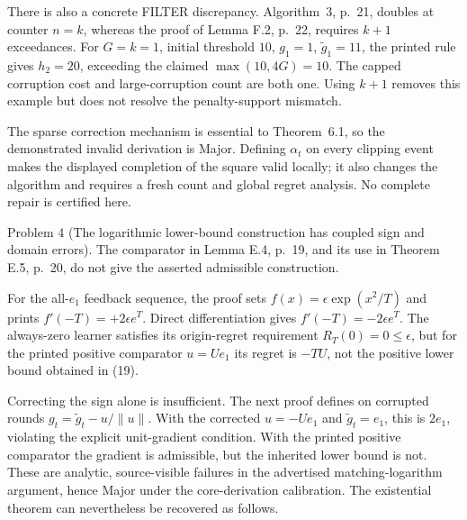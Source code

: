\documentclass[10pt]{article}
\begin{document}
There is also a concrete FILTER discrepancy. Algorithm 3, p. 21, doubles at counter \(n=k\), whereas the proof of Lemma F.2, p. 22, requires \(k+1\) exceedances. For \(G=k=1\), initial threshold \(10\), \(g_1=1\), \(\widetilde g_1=11\), the printed rule gives \(h_2=20\), exceeding the claimed \(\max(10,4G)=10\). The capped corruption cost and large-corruption count are both one. Using \(k+1\) removes this example but does not resolve the penalty-support mismatch.\par
The sparse correction mechanism is essential to Theorem 6.1, so the demonstrated invalid derivation is Major. Defining \(\alpha_t\) on every clipping event makes the displayed completion of the square valid locally; it also changes the algorithm and requires a fresh count and global regret analysis. No complete repair is certified here.\par
Problem 4 (The logarithmic lower-bound construction has coupled sign and domain errors).  The comparator in Lemma E.4, p. 19, and its use in Theorem E.5, p. 20, do not give the asserted admissible construction.\par
For the all-\(e_1\) feedback sequence, the proof sets \(f(x)=\epsilon\exp(x^2/T)\) and prints \(f'(-T)=+2\epsilon e^T\). Direct differentiation gives \(f'(-T)=-2\epsilon e^T\). The always-zero learner satisfies its origin-regret requirement \(R_T(0)=0\le\epsilon\), but for the printed positive comparator \(u=Ue_1\) its regret is \(-TU\), not the positive lower bound obtained in (19).\par
Correcting the sign alone is insufficient. The next proof defines on corrupted rounds \(g_t=\widetilde g_t-u/\|u\|\). With the corrected \(u=-Ue_1\) and \(\widetilde g_t=e_1\), this is \(2e_1\), violating the explicit unit-gradient condition. With the printed positive comparator the gradient is admissible, but the inherited lower bound is not. These are analytic, source-visible failures in the advertised matching-logarithm argument, hence Major under the core-derivation calibration. The existential theorem can nevertheless be recovered as follows.\par
\end{document}
